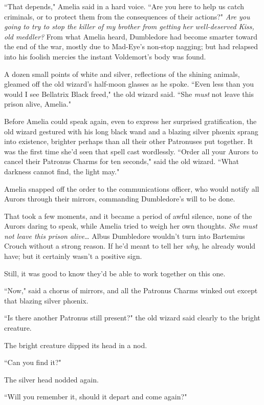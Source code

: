 ``That depends," Amelia said in a hard voice. ``Are you here to help us catch criminals, or to protect them from the consequences of their actions?" \emph{Are you going to try to stop the killer of my brother from getting her well-deserved Kiss, old meddler?} From what Amelia heard, Dumbledore had become smarter toward the end of the war, mostly due to Mad-Eye's non-stop nagging; but had relapsed into his foolish mercies the instant Voldemort's body was found.

A dozen small points of white and silver, reflections of the shining animals, gleamed off the old wizard's half-moon glasses as he spoke. ``Even less than you would I see Bellatrix Black freed," the old wizard said. ``She \emph{must} not leave this prison alive, Amelia."

Before Amelia could speak again, even to express her surprised gratification, the old wizard gestured with his long black wand and a blazing silver phœnix sprang into existence, brighter perhaps than all their other Patronuses put together. It was the first time she'd seen that spell cast wordlessly. ``Order all your Aurors to cancel their Patronus Charms for ten seconds," said the old wizard. ``What darkness cannot find, the light may."

Amelia snapped off the order to the communications officer, who would notify all Aurors through their mirrors, commanding Dumbledore's will to be done.

That took a few moments, and it became a period of awful silence, none of the Aurors daring to speak, while Amelia tried to weigh her own thoughts. \emph{She must not leave this prison alive{\ldots}} Albus Dumbledore wouldn't turn into Bartemius Crouch without a strong reason. If he'd meant to tell her \emph{why}, he already would have; but it certainly wasn't a positive sign.

Still, it was good to know they'd be able to work together on this one.

``Now," said a chorus of mirrors, and all the Patronus Charms winked out except that blazing silver phœnix.

``Is there another Patronus still present?" the old wizard said clearly to the bright creature.

The bright creature dipped its head in a nod.

``Can you find it?"

The silver head nodded again.

``Will you remember it, should it depart and come again?"

